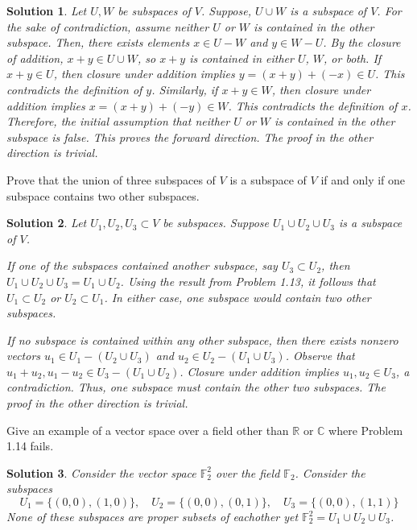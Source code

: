 \documentclass{book}
\newcommand{\real}{\mathbb{R}}
\newcommand{\complex}{\mathbb{C}}
\newcommand{\field}{\mathbb{F}}
\newtheorem*{soln}{Solution}
\theoremstyle{definition}
\begin{document}
\begin{soln}
    Let $U,W$ be subspaces of $V$. Suppose, $U\cup W$ is a subspace of $V$.
    For the sake of contradiction, assume neither $U$ or $W$ is contained in the
    other subspace. Then, there exists elements $x\in U-W$ and $y\in
    W-U$. By the closure of addition, $x+y \in U\cup W$, so $x+y$ is    
    contained in either $U$, $W$, or both. If $x+y \in U$, then closure under 
    addition implies $y = (x+y)+(-x) \in U$. This contradicts the definition
    of $y$. Similarly, if $x+y \in W$, then closure under addition implies $x =
    (x+y)+(-y) \in W$. This contradicts the definition of $x$. Therefore, the
    initial assumption that neither $U$ or $W$ is contained in the other
    subspace is false. This proves the forward direction. The proof in the other
    direction is trivial.
\end{soln}

\begin{problem}
    Prove that the union of three subspaces of $V$ is a subspace of $V$ if and 
    only if one subspace contains two other subspaces.
\end{problem}

\begin{soln}
    Let $U_1,U_2,U_3 \subset V$ be subspaces. Suppose $U_1 \cup U_2 \cup U_3$ is
    a subspace of $V$.

    If one of the subspaces contained another subspace, say $U_3 \subset U_2$, 
    then $U_1 \cup U_2 \cup U_3 = U_1 \cup U_2$. Using the result from Problem 
    1.13, it follows that $U_1 \subset U_2$ or $U_2 \subset U_1$. In either 
    case, one subspace would contain two other subspaces. 

    If no subspace is contained within any other subspace, then there exists
    nonzero vectors $u_1 \in U_1-(U_2\cup U_3)$ and $u_2 \in U_2-(U_1\cup U_3)$.
    Observe that $u_1+u_2,u_1-u_2 \in U_3 - (U_1\cup U_2)$. Closure under
    addition implies $u_1, u_2\in U_3$, a contradiction. Thus, one subspace must
    contain the other two subspaces. The proof in the other direction is trivial.
\end{soln}

\begin{problem}
    Give an example of a vector space over a field other than $\real$ or
    $\complex$ where Problem 1.14 fails.
\end{problem}

\begin{soln}
    Consider the vector space $\field^2_2$ over the field $\field_2$. Consider
    the subspaces 
    \[
        U_1 = \{(0,0),(1,0)\}, \quad U_2 = \{(0,0),(0,1)\}, \quad U_3 = 
    \{(0,0),(1,1)\}
    \]
    None of these subspaces are proper subsets of eachother yet $\field^2_2 =
    U_1\cup U_2 \cup U_3$. 
\end{soln}
\end{document}
